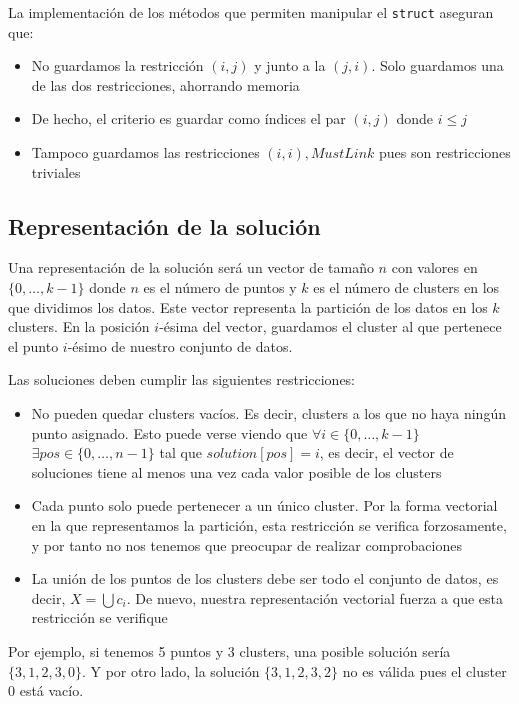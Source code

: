 \documentclass[11pt]{article}
\begin{document}
La implementación de los métodos que permiten manipular el \lstinline{struct} aseguran que:
\begin{itemize}
    \item No guardamos la restricción $(i, j)$ y junto a la $(j, i)$. Solo guardamos una de las dos restricciones, ahorrando memoria
    \item De hecho, el criterio es guardar como índices el par $(i, j)$ donde $i \leq j$
    \item Tampoco guardamos las restricciones $(i, i), MustLink$ pues son restricciones triviales
\end{itemize}


\subsection{Representación de la solución}

Una representación de la solución será un vector de tamaño $n$ con valores en $\{0, \ldots, k - 1\}$ donde $n$ es el número de puntos y $k$ es el número de clusters en los que dividimos los datos. Este vector representa la partición de los datos en los $k$ clusters. En la posición $i$-ésima del vector, guardamos el cluster al que pertenece el punto $i$-ésimo de nuestro conjunto de datos.

Las soluciones deben cumplir las siguientes restricciones:

\begin{itemize}
    \item No pueden quedar clusters vacíos. Es decir, clusters a los que no haya ningún punto asignado. Esto puede verse viendo que $\forall i \in \{0, \ldots, k-1\}$ $\exists pos \in \{0, \ldots, n-1\}$ tal que $solution[pos] = i$, es decir, el vector de soluciones tiene al menos una vez cada valor posible de los clusters
    \item Cada punto solo puede pertenecer a un único cluster. Por la forma vectorial en la que representamos la partición, esta restricción se verifica forzosamente, y por tanto no nos tenemos que preocupar de realizar comprobaciones
    \item La unión de los puntos de los clusters debe ser todo el conjunto de datos, es decir, $X = \bigcup c_i$. De nuevo, nuestra representación vectorial fuerza a que esta restricción se verifique
\end{itemize}

Por ejemplo, si tenemos 5 puntos y 3 clusters, una posible solución sería $\{3, 1, 2, 3, 0\}$. Y por otro lado, la solución $\{3, 1, 2, 3, 2\}$ no es válida pues el cluster $0$ está vacío.
\end{document}

